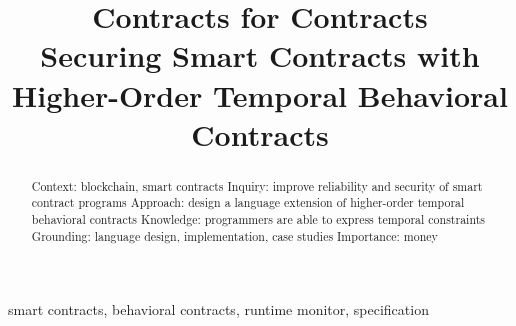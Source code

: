 \documentclass[10pt,conference]{IEEEtran}
\begin{document}
\title{Contracts for Contracts \\
  {\Large Securing Smart Contracts with Higher-Order Temporal Behavioral Contracts}
}

\author{ }


\maketitle


\begin{abstract}
  Context: blockchain, smart contracts
    Inquiry: improve reliability and security of smart contract programs
    Approach: design a language extension of higher-order temporal behavioral contracts
    Knowledge: programmers are able to express temporal constraints
    Grounding: language design, implementation, case studies
    Importance: money
\end{abstract}

\begin{IEEEkeywords}
  smart contracts, behavioral contracts, runtime monitor, specification
\end{IEEEkeywords}













\end{document}

